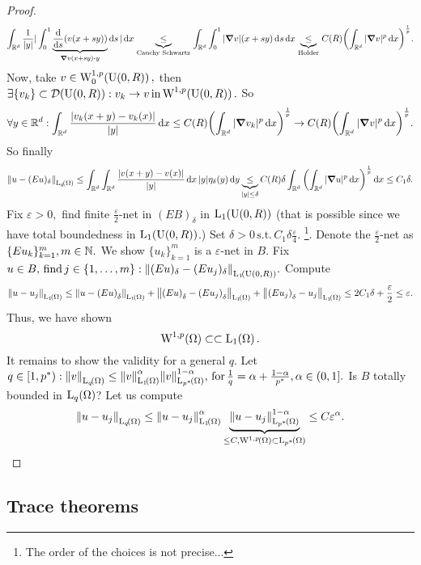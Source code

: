 \documentclass{article}
\begin{document}
\begin{proof}
\[
	\int_{\R^d}\frac{1}{|y|}|\int_{0}^1 \underbrace{\dv{s} \qty(v(x+sy))}_{\grad v\qty(x+sy) \vdot y}\dd{s}|\dd{x} \underbrace{\leq}_{\, \text{Cauchy Schwartz} \,} \int_{\R^d}\int_{0}^1 |\grad v| (x+sy)\dd{s}\dd{x} \underbrace{\leq}_{\, \text{Holder} \,} C(R)\qty(\int_{\R^d}|\grad v|^p \dd{x})^{\frac{1}{p}}.
\]
Now, take $v \in \WkpzeroSet[1][p]{\text{U}(0,R)}, $ then $\exists \{v_k\} \subset \mathcal{D}\qty(\text{U}(0,R)): v_k \to v \, \text{in} \, \WkpSet[1][p]{\text{U}(0,R)}.$ So
\[
	\forall y \in {\mathbb R}^d: \int_{{\mathbb R}^d}\frac{|v_k(x+y)-v_k(x)|}{|y|}\dd{x}\leq C(R) \qty(\int_{{\mathbb R}^d}|\grad v_k|^p\dd{x})^{\frac{1}{p}} \to C(R)\qty(\int_{{\mathbb R}^d}|\grad v|^p\dd{x})^{\frac{1}{p}}.
\]
So finally
\[
	\norm{u-(Eu)_{\delta}}_{\LpSet[q]{\Omega}} \leq \int_{\R^d}\int_{\R^d}\frac{|v(x+y)-v(x)|}{|y|}\dd{x} |y| \eta_{\delta}(y)\dd{y} \underbrace{\leq}_{|y|\leq \delta} C(R) \delta \int_{\R^d}\qty(\int_{\R^d}|\grad u|^p \dd{x})^{\frac{1}{p}}\dd{x} \leq C_1 \delta.
\]
Fix $\varepsilon >0, $ find finite $\frac{\varepsilon}{2}$-net in $(EB)_{\delta}$ in $\LpSet[1]{\text{U}(0,R)}$ (that is possible since we have total boundedness in $\LpSet[1]{\text{U}(0,R)}$.) Set $\delta >0 \, \text{s.t.} \, C_1 \delta \frac{\varepsilon}{4}.$ \footnote{The order of the choices is not precise...}. Denote the $\frac{\varepsilon}{2}$-net as $\{Eu_k\}_{k=1}^{m}, m \in {\mathbb N}.$ We show $\{u_k\}_{k=1}^{m}$ is a $\varepsilon$-net in $B$. Fix $u \in B, \, \text{find} \, j \in \{1,\dots,m\}: \norm{(Eu)_{\delta}-(Eu_j)_{\delta}}_{\LpSet[1]{\text{U}(0,R)}}.$ Compute
\[
	\norm{u-u_j}_{\LpSet[1]{\Omega}} \leq \norm{u-\qty(Eu)_{\delta}}_{\LpSet[1]{\Omega}} + \norm{\qty(Eu)_{\delta}-\qty(Eu_j)_{\delta}}_{\LpSet[1]{\Omega}}+ \norm{\qty(Eu_j)_{\delta}-u_j}_{\LpSet[1]{\Omega}}\leq 2C_1 \delta + \frac{\varepsilon}{2} \leq \varepsilon.
\]
Thus, we have shown
\[
	\WkpSet[1][p]{\Omega} \subset \subset \LpSet[1]{\Omega}.
\]
It remains to show the validity for a general $q$. Let $q \in [1,p^{*}): \norm{v}_{\LpSet[q]{\Omega}} \leq \norm{v}_{\LpSet[1]{\Omega}}^\alpha \norm{v}_{\LpSet[p^{*}]{\Omega}}^{1-\alpha}, \, \text{for} \, \frac{1}{q}=\alpha + \frac{1-\alpha}{p^{*}}, \alpha \in (0,1].$ Is $B$ totally bounded in $\LpSet[q]{\Omega}$? Let us compute
\[
	\norm{u-u_j}_{\LpSet[q]{\Omega}}\leq \norm{u-u_j}_{\LpSet[1]{\Omega}}^\alpha \underbrace{\norm{u-u_j}_{\LpSet[p^{*}]{\Omega}}^{1-\alpha}}_{\leq C, \WkpSet[1][p]{\Omega}\subset \LpSet[p^{*}]{\Omega}}\leq C \varepsilon^\alpha.
\]
\end{proof}

\subsection{Trace theorems}
\label{sec:traces}
\end{document}
